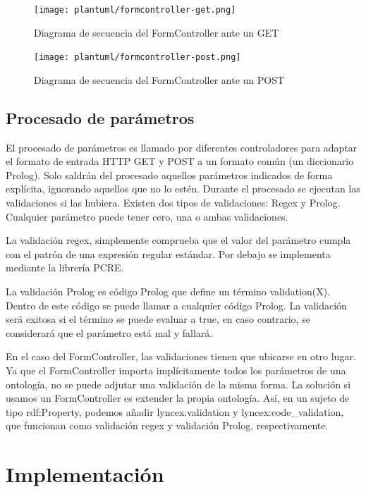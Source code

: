 \documentclass[12pt]{report} %
\begin{document}
\begin{figure}[h]
    \centering
    \texttt{[image: plantuml/formcontroller-get.png]}
    \caption{Diagrama de secuencia del FormController ante un GET}
    \label{fig:formcontrollerget}
\end{figure}

\begin{figure}[h]
    \centering
    \texttt{[image: plantuml/formcontroller-post.png]}
    \caption{Diagrama de secuencia del FormController ante un POST}
    \label{fig:formcontrollerpost}
\end{figure}

\section{Procesado de parámetros}
El procesado de parámetros es llamado por diferentes controladores para adaptar el formato de entrada HTTP GET y POST a un formato común (un diccionario Prolog).
Solo saldrán del procesado aquellos parámetros indicados de forma explícita, ignorando aquellos que no lo estén.
Durante el procesado se ejecutan las validaciones si las hubiera. Existen dos tipos de validaciones: Regex y Prolog.
Cualquier parámetro puede tener cero, una o ambas validaciones.

La validación regex, simplemente comprueba que el valor del parámetro cumpla con el patrón de una expresión regular estándar. Por debajo se implementa mediante la librería PCRE.

La validación Prolog es código Prolog que define un término validation(X). Dentro de este código se puede llamar a cualquier código Prolog.
La validación será exitosa si el término se puede evaluar a true, en caso contrario, se considerará que el parámetro está mal y fallará.

En el caso del FormController, las validaciones tienen que ubicarse en otro lugar. Ya que el FormController importa implícitamente todos los parámetros de una ontología, no se puede adjutar una validación de la misma forma.
La solución si usamos un FormController es extender la propia ontología.
Así, en un sujeto de tipo rdf:Property, podemos añadir lyncex:validation y lyncex:code\_validation, que funcionan como validación regex y validación Prolog, respectivamente.

\chapter{Implementación}
\end{document}
